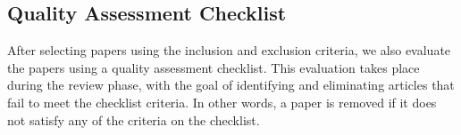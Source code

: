 % 
\subsection{Quality Assessment Checklist}
After selecting papers using the inclusion and exclusion criteria, we also evaluate the papers using a quality assessment checklist. This evaluation takes place during the review phase, with the goal of identifying and eliminating articles that fail to meet the checklist criteria. In other words, a paper is removed if it does not satisfy any of the criteria on the checklist.


